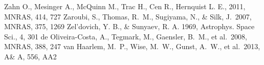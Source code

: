 \begin{thebibliography}{99}
\begin{multicols}{2}
{ Zahn O., Mesinger A., McQuinn M., Trac H., Cen R., Hernquist L. E., 2011, MNRAS, 414, 727
 Zaroubi, S., Thomas, R.~M., Sugiyama, N., \& Silk, J.\ 2007, MNRAS, 375, 1269 
 Zel'dovich, Y. B., \& Sunyaev, R. A. 1969, Astrophys. Space Sci., 4, 301 
 de Oliveira-Costa, A., Tegmark, M., Gaensler, B.~M., et al.\ 2008, MNRAS, 388, 247 
 van Haarlem, M.~P., Wise, M.~W., Gunst, A.~W., et al.\ 2013, A\& A, 556, AA2 
}\end{multicols}
\end{thebibliography}
